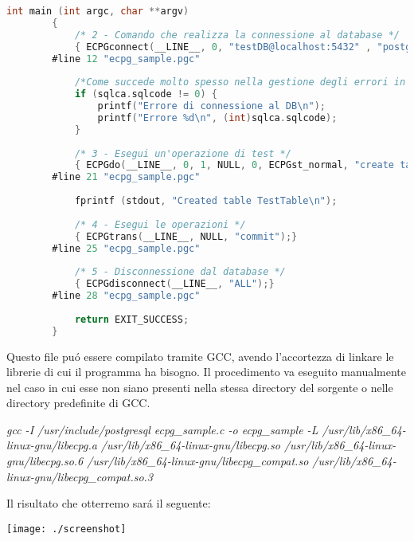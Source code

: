\documentclass[12pt,a4paper,onecolumn]{article}
\begin{document}
\begin{lstlisting}[language=C, caption=testECPG.c]
		int main (int argc, char **argv)
		{
			/* 2 - Comando che realizza la connessione al database */
			{ ECPGconnect(__LINE__, 0, "testDB@localhost:5432" , "postgres" , "portento123" , NULL, 0); }
		#line 12 "ecpg_sample.pgc"
			
			/*Come succede molto spesso nella gestione degli errori in linguaggio C, il valore ritornato da una funzione viene utilizzato anche come codice di errore, considerando lo 0 come esecuzione andata a buon fine */
			if (sqlca.sqlcode != 0)	{
				printf("Errore di connessione al DB\n");
				printf("Errore %d\n", (int)sqlca.sqlcode);
			}
			
			/* 3 - Esegui un'operazione di test */
			{ ECPGdo(__LINE__, 0, 1, NULL, 0, ECPGst_normal, "create table TableTest ( number integer , ascii char ( 16 ) )", ECPGt_EOIT, ECPGt_EORT);}
		#line 21 "ecpg_sample.pgc"
		
			fprintf (stdout, "Created table TestTable\n");
			
			/* 4 - Esegui le operazioni */
			{ ECPGtrans(__LINE__, NULL, "commit");}
		#line 25 "ecpg_sample.pgc"
		
			/* 5 - Disconnessione dal database */
			{ ECPGdisconnect(__LINE__, "ALL");}
		#line 28 "ecpg_sample.pgc"
			
			return EXIT_SUCCESS;
		}
	\end{lstlisting}
	\begin{flushleft}
		Questo file pu\'{o} essere compilato tramite GCC, avendo l'accortezza di linkare le librerie di cui il programma ha bisogno. Il procedimento va eseguito manualmente nel caso in cui esse non siano presenti nella stessa directory del sorgente o nelle directory predefinite di GCC.
	\end{flushleft}
	\begin{center}
	\textit{gcc -I /usr/include/postgresql ecpg\_sample.c -o ecpg\_sample -L /usr/lib/x86\_64-linux-gnu/libecpg.a /usr/lib/x86\_64-linux-gnu/libecpg.so /usr/lib/x86\_64-linux-gnu/libecpg.so.6 /usr/lib/x86\_64-linux-gnu/libecpg\_compat.so /usr/lib/x86\_64-linux-gnu/libecpg\_compat.so.3}
	\end{center}
	\begin{flushleft}
	Il risultato che otterremo sar\'{a} il seguente:
	\end{flushleft}
	\begin{center}
	\texttt{[image: ./screenshot]}
	\end{center}
	
\end{document}
